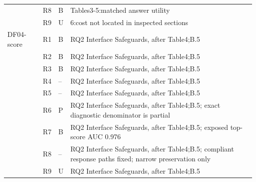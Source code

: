 \begin{longtable}{@{}p{}p{}p{}p{}@{}}
 & R8 & B & Tables3-5:matched answer utility\\
 & R9 & U & 6:cost not located in inspected sections\\
\addlinespace[1pt]
DF04-score~\cite{dpmemview2026} & R1 & B & RQ2 Interface Safeguards, after Table4;B.5\\
 & R2 & B & RQ2 Interface Safeguards, after Table4;B.5\\
 & R3 & B & RQ2 Interface Safeguards, after Table4;B.5\\
 & R4 & -- & RQ2 Interface Safeguards, after Table4;B.5\\
 & R5 & -- & RQ2 Interface Safeguards, after Table4;B.5\\
 & R6 & P & RQ2 Interface Safeguards, after Table4;B.5; exact diagnostic denominator is partial\\
 & R7 & B & RQ2 Interface Safeguards, after Table4;B.5; exposed top-score AUC 0.976\\
 & R8 & -- & RQ2 Interface Safeguards, after Table4;B.5; compliant response paths fixed; narrow preservation only\\
 & R9 & U & RQ2 Interface Safeguards, after Table4;B.5\\
\bottomrule\end{longtable}
